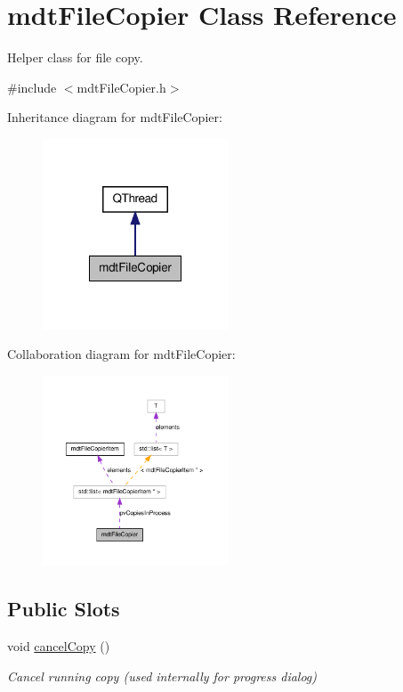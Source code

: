 \hypertarget{classmdt_file_copier}{\section{mdt\-File\-Copier Class Reference}
\label{classmdt_file_copier}
}


Helper class for file copy.  




{\ttfamily \#include $<$mdt\-File\-Copier.\-h$>$}



Inheritance diagram for mdt\-File\-Copier\-:
\nopagebreak
\begin{figure}[H]
\begin{center}
\leavevmode
\includegraphics[width=156pt]{classmdt_file_copier__inherit__graph}
\end{center}
\end{figure}


Collaboration diagram for mdt\-File\-Copier\-:
\nopagebreak
\begin{figure}[H]
\begin{center}
\leavevmode
\includegraphics[width=156pt]{classmdt_file_copier__coll__graph}
\end{center}
\end{figure}
\subsection*{Public Slots}
\begin{DoxyCompactItemize}
\item 
void \hyperlink{classmdt_file_copier_ab9a0a4121a3fa0c70652413ad7917714}{cancel\-Copy} ()
\begin{DoxyCompactList}\small\item\em Cancel running copy (used internally for progress dialog) \end{DoxyCompactList}\end{DoxyCompactItemize}
